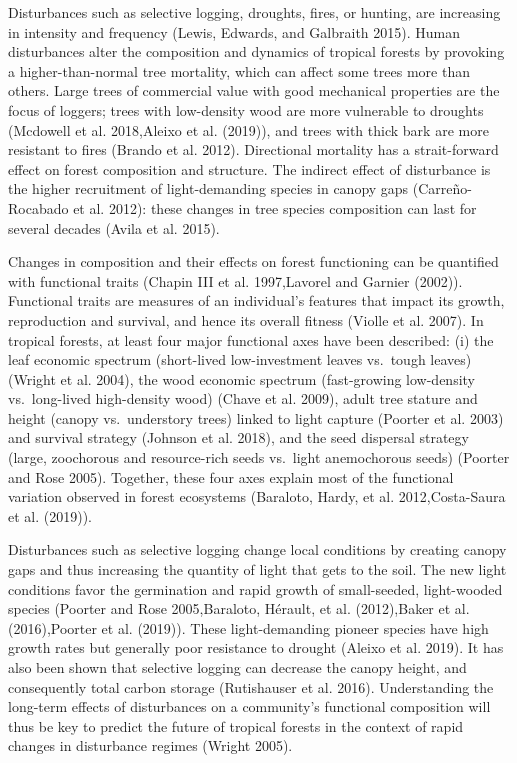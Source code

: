 \documentclass[]{elsarticle} %
\begin{document}
Disturbances such as selective logging, droughts, fires, or hunting, are
increasing in intensity and frequency (Lewis, Edwards, and Galbraith
2015). Human disturbances alter the composition and dynamics of tropical
forests by provoking a higher-than-normal tree mortality, which can
affect some trees more than others. Large trees of commercial value with
good mechanical properties are the focus of loggers; trees with
low-density wood are more vulnerable to droughts (Mcdowell et al.
2018,Aleixo et al. (2019)), and trees with thick bark are more resistant
to fires (Brando et al. 2012). Directional mortality has a
strait-forward effect on forest composition and structure. The indirect
effect of disturbance is the higher recruitment of light-demanding
species in canopy gaps (Carreño-Rocabado et al. 2012): these changes in
tree species composition can last for several decades (Avila et al.
2015).

Changes in composition and their effects on forest functioning can be
quantified with functional traits (Chapin III et al. 1997,Lavorel and
Garnier (2002)). Functional traits are measures of an individual's
features that impact its growth, reproduction and survival, and hence
its overall fitness (Violle et al. 2007). In tropical forests, at least
four major functional axes have been described: (i) the leaf economic
spectrum (short-lived low-investment leaves vs.~tough leaves) (Wright et
al. 2004), the wood economic spectrum (fast-growing low-density
vs.~long-lived high-density wood) (Chave et al. 2009), adult tree
stature and height (canopy vs.~understory trees) linked to light capture
(Poorter et al. 2003) and survival strategy (Johnson et al. 2018), and
the seed dispersal strategy (large, zoochorous and resource-rich seeds
vs.~light anemochorous seeds) (Poorter and Rose 2005). Together, these
four axes explain most of the functional variation observed in forest
ecosystems (Baraloto, Hardy, et al. 2012,Costa-Saura et al. (2019)).

Disturbances such as selective logging change local conditions by
creating canopy gaps and thus increasing the quantity of light that gets
to the soil. The new light conditions favor the germination and rapid
growth of small-seeded, light-wooded species (Poorter and Rose
2005,Baraloto, Hérault, et al. (2012),Baker et al. (2016),Poorter et al.
(2019)). These light-demanding pioneer species have high growth rates
but generally poor resistance to drought (Aleixo et al. 2019). It has
also been shown that selective logging can decrease the canopy height,
and consequently total carbon storage (Rutishauser et al. 2016).
Understanding the long-term effects of disturbances on a community's
functional composition will thus be key to predict the future of
tropical forests in the context of rapid changes in disturbance regimes
(Wright 2005).
\end{document}
